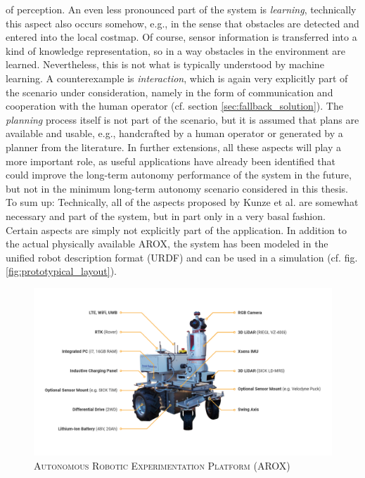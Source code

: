 \documentclass[english, master, utf8]{base/thesis_KBS}
\begin{document}
of perception. An even less pronounced part of the system is \textit{learning}, technically this aspect also occurs somehow, e.g., in the sense that obstacles are detected and entered
into the local costmap. Of course,
sensor information is transferred into a kind of knowledge representation, so in a way obstacles in the environment are learned. Nevertheless, this is not what is typically
understood by machine learning. A counterexample is \textit{interaction}, which is again very explicitly part of the scenario under consideration, namely in the form of communication and
cooperation with the human operator (cf. section \ref{sec:fallback_solution}). The \textit{planning} process itself is not part of the scenario, but it is assumed that plans are available and usable,
e.g., handcrafted by a human operator or generated by a planner from the literature. In further extensions, all these aspects will play a more important role, as useful applications
have already been identified that could improve the long-term autonomy performance of the system in the future, but not in the minimum long-term autonomy scenario considered in this
thesis. To sum up: Technically, all of the aspects proposed by Kunze et al. are somewhat necessary and part of the system, but in part only in a very basal fashion. Certain aspects
are simply not explicitly part of the application. In addition to the actual physically available AROX, the system has been modeled in the unified robot description format (URDF) and
can be used in a simulation (cf. fig. \ref{fig:prototypical_layout}).
\begin{figure}[H]
    \centering
    \includegraphics[width=\textwidth]{pics/robot_description.png}
    \caption{\textsc{Autonomous Robotic Experimentation Platform (AROX)}}
    \label{fig:arox_system}
\end{figure}
\end{document}
